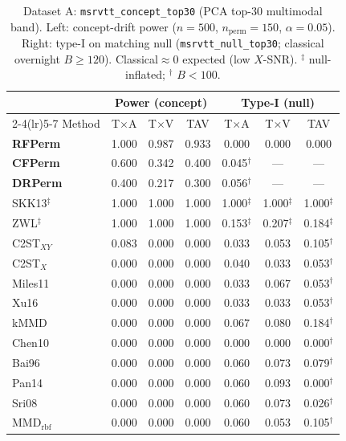 
\begin{table}[t]
\centering\scriptsize\setlength{\tabcolsep}{2.5pt}
\caption{Dataset A: \texttt{msrvtt\_concept\_top30} (PCA top-30 multimodal band).
  Left: concept-drift power ($n=500$, $n_{\mathrm{perm}}=150$, $\alpha=0.05$).
  Right: type-I on matching null (\texttt{msrvtt\_null\_top30}; classical overnight $B\ge 120$).
  Classical$\approx 0$ expected (low $X$-SNR). $^\ddagger$ null-inflated; $^\dagger$ $B<100$.
}
\label{tab:bench-msrvtt-concept-top30}
\begin{tabular}{l ccc @{\hspace{1.0em}} ccc}
\toprule
& \multicolumn{3}{c}{\textbf{Power} (concept)} & \multicolumn{3}{c}{\textbf{Type-I} (null)} \\
\cmidrule(lr){2-4}\cmidrule(lr){5-7}
Method & T$\times$A & T$\times$V & TAV & T$\times$A & T$\times$V & TAV \\
\midrule
\textbf{RFPerm} & 1.000 & 0.987 & 0.933 & 0.000 & 0.000 & 0.000 \\
\textbf{CFPerm} & 0.600 & 0.342 & 0.400 & 0.045$^\dagger$ & --- & --- \\
\textbf{DRPerm} & 0.400 & 0.217 & 0.300 & 0.056$^\dagger$ & --- & --- \\
\midrule
SKK13$^\ddagger$ & 1.000 & 1.000 & 1.000 & 1.000$^\ddagger$ & 1.000$^\ddagger$ & 1.000$^\ddagger$ \\
ZWL$^\ddagger$ & 1.000 & 1.000 & 1.000 & 0.153$^\ddagger$ & 0.207$^\ddagger$ & 0.184$^\ddagger$ \\
C2ST$_{XY}$ & 0.083 & 0.000 & 0.000 & 0.033 & 0.053 & 0.105$^\dagger$ \\
C2ST$_X$ & 0.000 & 0.000 & 0.000 & 0.040 & 0.033 & 0.053$^\dagger$ \\
Miles11 & 0.000 & 0.000 & 0.000 & 0.033 & 0.067 & 0.053$^\dagger$ \\
Xu16 & 0.000 & 0.000 & 0.000 & 0.033 & 0.033 & 0.053$^\dagger$ \\
kMMD & 0.000 & 0.000 & 0.000 & 0.067 & 0.080 & 0.184$^\dagger$ \\
Chen10 & 0.000 & 0.000 & 0.000 & 0.000 & 0.000 & 0.000$^\dagger$ \\
Bai96 & 0.000 & 0.000 & 0.000 & 0.060 & 0.073 & 0.079$^\dagger$ \\
Pan14 & 0.000 & 0.000 & 0.000 & 0.060 & 0.093 & 0.000$^\dagger$ \\
Sri08 & 0.000 & 0.000 & 0.000 & 0.060 & 0.073 & 0.026$^\dagger$ \\
MMD$_{\mathrm{rbf}}$ & 0.000 & 0.000 & 0.000 & 0.060 & 0.053 & 0.105$^\dagger$ \\
\bottomrule\end{tabular}
\end{table}

